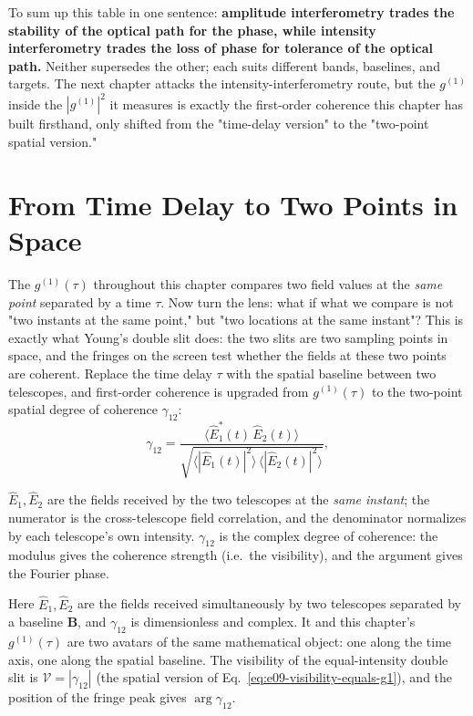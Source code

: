 To sum up this table in one sentence: \textbf{amplitude interferometry trades the stability of the optical path for the phase, while intensity interferometry trades the loss of phase for tolerance of the optical path.} Neither supersedes the other; each suits different bands, baselines, and targets. The next chapter attacks the intensity-interferometry route, but the \(g^{(1)}\) inside the \(|g^{(1)}|^2\) it measures is exactly the first-order coherence this chapter has built firsthand, only shifted from the "time-delay version" to the "two-point spatial version."

\section{From Time Delay to Two Points in Space}
\label{sec:e09-spatial-gamma}

The \(g^{(1)}(\tau)\) throughout this chapter compares two field values at the \emph{same point} separated by a time \(\tau\). Now turn the lens: what if what we compare is not "two instants at the same point," but "two locations at the same instant"? This is exactly what Young's double slit does: the two slits are two sampling points in space, and the fringes on the screen test whether the fields at these two points are coherent. Replace the time delay \(\tau\) with the spatial baseline between two telescopes, and first-order coherence is upgraded from \(g^{(1)}(\tau)\) to the two-point spatial degree of coherence \(\gamma_{12}\):
\begin{equation}
  \gamma_{12}=
  \frac{\big\langle \hat E_1^\ast(t)\,\hat E_2(t)\big\rangle}
       {\sqrt{\big\langle|\hat E_1(t)|^2\big\rangle\,\big\langle|\hat E_2(t)|^2\big\rangle}} ,
  \label{eq:e09-gamma12}
\end{equation}
\begin{formulaexplain}
\(\hat E_1,\hat E_2\) are the fields received by the two telescopes at the \emph{same instant}; the numerator is the cross-telescope field correlation, and the denominator normalizes by each telescope's own intensity. \(\gamma_{12}\) is the complex degree of coherence: the modulus gives the coherence strength (i.e.\ the visibility), and the argument gives the Fourier phase.
\end{formulaexplain}
Here \(\hat E_1,\hat E_2\) are the fields received simultaneously by two telescopes separated by a baseline \(\bm B\), and \(\gamma_{12}\) is dimensionless and complex. It and this chapter's \(g^{(1)}(\tau)\) are two avatars of the same mathematical object: one along the time axis, one along the spatial baseline. The visibility of the equal-intensity double slit is \(\mathcal V=|\gamma_{12}|\) (the spatial version of Eq.~\eqref{eq:e09-visibility-equals-g1}), and the position of the fringe peak gives \(\arg\gamma_{12}\).

